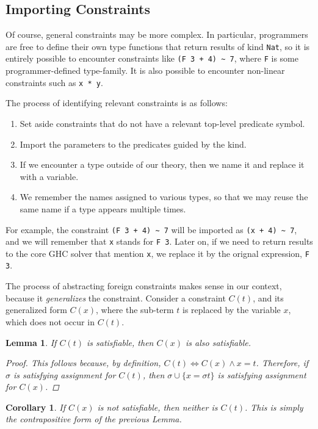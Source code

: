 \documentclass{sigplanconf}
\newtheorem*{lemma}{Lemma}
\newtheorem*{corollary}{Corollary}
\begin{document}
\subsection{Importing Constraints}

Of course, general constraints may be more complex.  In particular,
programmers are free to define their own type functions that return
results of kind \Verb"Nat", so it is entirely possible to encounter
constraints like \Verb"(F 3 + 4) ~ 7", where \Verb"F" is some programmer-defined
type-family.  It is also possible to encounter non-linear constraints such
as \Verb"x * y".

The process of identifying relevant constraints is as follows:
\begin{enumerate}
\item Set aside constraints that do not have a relevant top-level predicate
symbol.
\item Import the parameters to the predicates guided by the kind.
\item If we encounter a type outside of our theory, then we name it and replace
      it with a variable.
\item We remember the names assigned to various types, so that we may reuse
      the same name if a type appears multiple times.
\end{enumerate}

For example, the constraint \Verb"(F 3 + 4) ~ 7" will be imported as
\Verb"(x + 4) ~ 7", and we will remember that \Verb"x" stands for \Verb"F 3".
Later on, if we need to return results to the core GHC solver that mention
\Verb"x", we replace it by the orignal expression, \Verb"F 3".

The process of abstracting foreign constraints makes sense in our context,
because it {\em generalizes} the constraint.  Consider a constraint $C(t)$, and
its generalized form $C(x)$, where the sub-term $t$ is replaced by
the variable $x$, which does not occur in $C(t)$.

\begin{lemma}
If $C(t)$ is satisfiable, then $C(x)$ is also satisfiable.
\begin{proof} This follows because, by definition,
$C(t) \iff C(x) \wedge x = t$. Therefore, if $\sigma$ is satisfying
assignment for $C(t)$, then $\sigma \cup \{ x = \sigma t \}$ is satisfying
assignment for $C(x)$.
\end{proof}
\end{lemma}

\begin{corollary} If $C(x)$ is not satisfiable, then neither is $C(t)$.
This is simply the contrapositive form of the previous Lemma.
\end{corollary}
\end{document}
